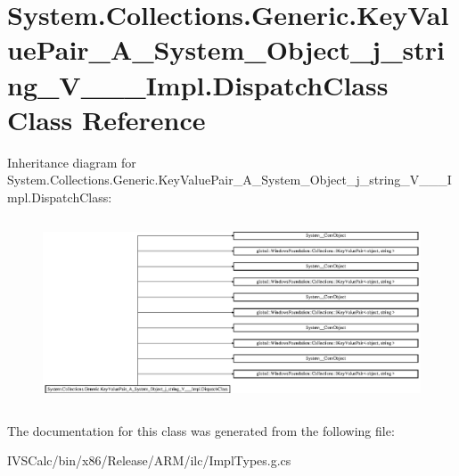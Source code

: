 \hypertarget{class_system_1_1_collections_1_1_generic_1_1_key_value_pair___a___system___object__j__string___v_______impl_1_1_dispatch_class}{}\section{System.\+Collections.\+Generic.\+Key\+Value\+Pair\+\_\+\+A\+\_\+\+System\+\_\+\+Object\+\_\+j\+\_\+string\+\_\+\+V\+\_\+\+\_\+\+\_\+\+Impl.\+Dispatch\+Class Class Reference}
\label{class_system_1_1_collections_1_1_generic_1_1_key_value_pair___a___system___object__j__string___v_______impl_1_1_dispatch_class}
Inheritance diagram for System.\+Collections.\+Generic.\+Key\+Value\+Pair\+\_\+\+A\+\_\+\+System\+\_\+\+Object\+\_\+j\+\_\+string\+\_\+\+V\+\_\+\+\_\+\+\_\+\+Impl.\+Dispatch\+Class\+:\begin{figure}[H]
\begin{center}
\leavevmode
\includegraphics[height=5.549550cm]{class_system_1_1_collections_1_1_generic_1_1_key_value_pair___a___system___object__j__string___v_______impl_1_1_dispatch_class}
\end{center}
\end{figure}


The documentation for this class was generated from the following file\+:\begin{DoxyCompactItemize}
\item 
I\+V\+S\+Calc/bin/x86/\+Release/\+A\+R\+M/ilc/Impl\+Types.\+g.\+cs\end{DoxyCompactItemize}
